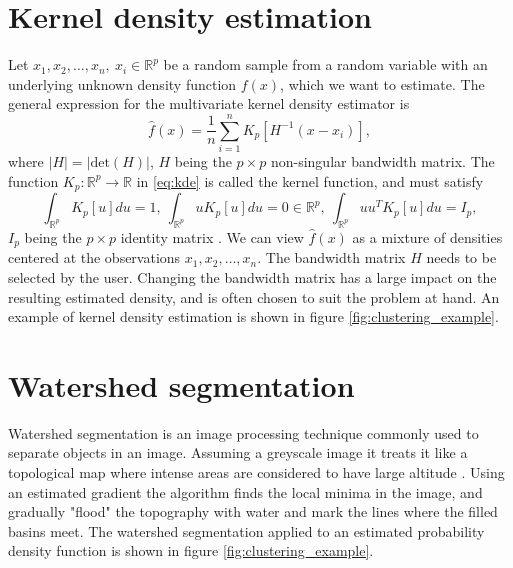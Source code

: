 \documentclass[a4paper, 10pt]{memoir}
\theoremstyle{plain}
\theoremstyle{definition}
\theoremstyle{remark}
\begin{document}
\section{Kernel density estimation}\label{sec:kde}
Let $x_1, x_2, \hdots, x_n, \ x_i \in \mathbb{R}^p$ be a random sample from a random variable with an underlying unknown density function $f(x)$, which we want to estimate.
The general expression for the multivariate kernel density estimator is \cite{simonoff}
\begin{equation}\label{eq:kde}
        \hat{f}(x)   = \frac{1}{n} \sum_{i = 1}^{n} K_p \left[ H^{-1}(x - x_i) \right],
\end{equation}
where $|H| = |\text{det} (H)|$, $H$ being the $p \times p$ non-singular bandwidth matrix.
The function $K_p : \mathbb{R}^p \rightarrow \mathbb{R}$ in \eqref{eq:kde} is called the kernel function, and must satisfy
\begin{equation*}
        \int_{\mathbb{R}^p}^{} K_p [u]du = 1, \ \int_{\mathbb{R}^p}^{}uK_p [u]du = 0 \in \mathbb{R}^p, \ \int_{\mathbb{R}^p}^{} u u^T K_p [u]du = I_p,
\end{equation*}
$I_p$ being the $p \times p$ identity matrix \cite{simonoff}.
We can view $\hat{f}(x)$ as a mixture of densities centered at the observations $x_1, x_2, \hdots, x_n$.
The bandwidth matrix $H$ needs to be selected by the user.
Changing the bandwidth matrix has a large impact on the resulting estimated density, and is often chosen to suit the problem at hand.
An example of kernel density estimation is shown in figure \ref{fig:clustering_example}.







\section{Watershed segmentation}
Watershed segmentation is an image processing technique commonly used to separate objects in an image.
Assuming a greyscale image it treats it like a topological map where intense areas are considered to have large altitude \cite{najman}.
Using an estimated gradient the algorithm finds the local minima in the image, and gradually "flood" the topography with water and mark the lines where the filled basins meet.
The watershed segmentation applied to an estimated probability density function is shown in figure \ref{fig:clustering_example}.
\end{document}

